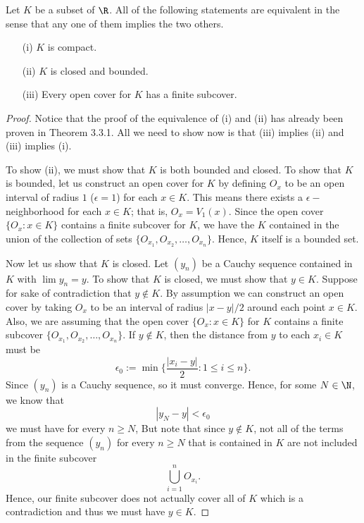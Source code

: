 \begin{tcolorbox}
    \begin{thm}
Let \( K \) be a subset of \( \R \). All of the following statements are equivalent in the sense that any one of them implies the two others. 
\begin{enumerate}
    \item[(i)] \( K \) is compact.
    \item[(ii)] \( K \) is closed and bounded.
    \item[(iii)] Every open cover for \( K \) has a finite subcover.
\end{enumerate}
\end{thm}
\end{tcolorbox}

\begin{proof}
Notice that the proof of the equivalence of (i) and (ii) has already been proven in Theorem 3.3.1. All we need to show now is that (iii) implies (ii) and (iii) implies (i). 

To show (ii), we must show that \( K \) is both bounded and closed. To show that \( K \) is bounded, let us construct an open cover for \( K \) by defining \( O_x  \) to be an open interval of radius \( 1 \) (\( \epsilon  = 1  \)) for each \( x \in K \). This means there exists a \( \epsilon - \)neighborhood for each \( x \in K \); that is, \( O_x = V_1(x) \). Since the open cover \( \{ O_x : x \in K \}  \) contains a finite subcover for \( K \), we have the \( K \) contained in the union of the collection of sets \( \{ O_{x_1}, O_{x_2}, \dots , O_{x_n} \}  \). Hence, \( K \) itself is a bounded set.

Now let us show that \( K \) is closed. Let \( (y_n) \) be a Cauchy sequence contained in \( K \) with \( \lim y_n = y  \). To show that \( K \) is closed, we must show that \( y \in K \). Suppose for sake of contradiction that \( y \notin K  \). By assumption we can construct an open cover by taking \( O_x  \) to be an interval of radius \( | x - y  | / 2  \) around each point \( x \in K \). Also, we are assuming that the open cover \( \{ O_x : x \in K \}  \) for \( K \) contains a finite subcover \( \{ O_{x_1}, O_{x_2}, \dots, O_{x_n} \}  \). If \( y \notin K \), then the distance from \( y \) to each \( x_i \in K \) must be 
\[ \epsilon_0 := \min \Big\{ \frac{ | x_i - y  |  }{ 2  }   : 1 \leq i \leq n \Big\}.\]
Since \( (y_n) \) is a Cauchy sequence, so it must converge. Hence, for some \( N \in \N \), we know that 
\[ | y_N - y  | < \epsilon_0 \] we must have for every \( n \geq N \), 
But note that since \( y \notin K  \), not all of the terms from the sequence \( (y_n) \) for every \( n \geq N \) that is contained in \( K \) are not included in the finite subcover
\[ \bigcup_{ i=1 }^{ n } O_{x_i}. \]
Hence, our finite subcover does not actually cover all of \( K \) which is a contradiction and thus we must have \( y \in K \).




\end{proof}



